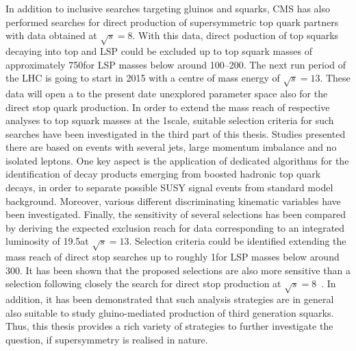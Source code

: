 In addition to inclusive searches targeting gluinos and squarks, CMS has also performed searches for direct production of supersymmetric top quark partners with data obtained at $\sqrt{s} = 8$\tev. With this data, direct poduction of top squarks decaying into top and LSP could be excluded up to top squark masses of approximately 750\gev for LSP masses below around 100--200\gev. The next run period of the LHC is going to start in 2015 with a centre of mass energy of $\sqrt{s} = 13$\tev. These data will open a to the present date unexplored parameter space also for the direct stop quark production. In order to extend the mass reach of respective analyses to top squark masses at the 1\tev scale, suitable selection criteria for such searches have been investigated in the third part of this thesis. Studies presented there are based on events with several jets, large momentum imbalance and no isolated leptons. One key aspect is the application of dedicated algorithms for the identification of decay products emerging from boosted hadronic top quark decays, in order to separate possible SUSY signal events from standard model background. Moreover, various different discriminating kinematic variables have been investigated. Finally, the sensitivity of several selections has been compared by deriving the expected exclusion reach for data corresponding to an integrated luminosity of 19.5\fbinv at $\sqrt{s} = 13$\tev. Selection criteria could be identified extending the mass reach of direct stop searches up to roughly 1\tev for LSP masses below around 300\gev. It has been shown that the proposed selections are also more sensitive than a selection following closely the search for direct stop production at $\sqrt{s} = 8$\tev~\cite{CMS-PAS-SUS-13-015}. In addition, it has been demonstrated that such analysis strategies are in general also suitable to study gluino-mediated production of third generation squarks. Thus, this thesis provides a rich variety of strategies to further investigate the question, if supersymmetry is realised in nature. 


